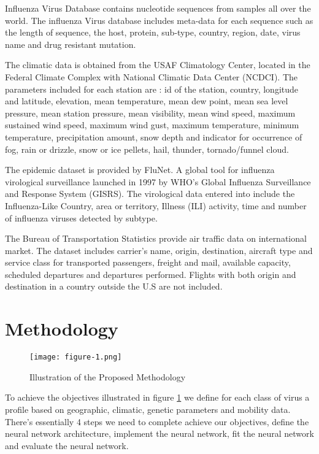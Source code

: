 \documentclass[12pt]{article}
\begin{document}
Influenza Virus Database\autocite{IVD-fb} contains nucleotide sequences from samples all over the world. The influenza Virus database includes meta-data for each sequence such as the length of sequence, the host, protein, sub-type, country, region, date, virus name and  drug resistant mutation. 

The climatic data is obtained from the USAF Climatology Center, located in the Federal Climate Complex with National Climatic Data Center (NCDCI)\autocite{Lott1998}. The parameters included for each station are : id of the station, country, longitude and latitude, elevation, mean temperature, mean dew point, mean sea level pressure, mean station pressure, mean visibility, mean wind speed, maximum sustained wind speed, maximum wind gust, maximum temperature, minimum temperature, precipitation amount, snow depth and indicator for occurrence of fog, rain or drizzle, snow or ice pellets, hail, thunder, tornado/funnel cloud.

The epidemic dataset is provided by FluNet\autocite{flahault1998}. A global tool for influenza virological surveillance launched in 1997  by WHO's Global Influenza Surveillance and Response System (GISRS). The virological data entered into include the Influenza-Like Country, area or territory, Illness (ILI) activity, time and number of influenza viruses detected by subtype.

The Bureau of Transportation Statistics provide air traffic data on international market. The dataset includes carrier's name, origin, destination, aircraft type and service class for transported passengers, freight and mail, available capacity, scheduled departures and departures performed. Flights with both origin and destination in a country outside the U.S are not included.

\section{Methodology}

\begin{figure}[h]
    \centering
    \texttt{[image: figure-1.png]}
    \caption{ Illustration of the Proposed Methodology}
    \label{fig:mesh1}
\end{figure}

To achieve the objectives illustrated in figure \ref{fig:mesh1} we define for each class of virus a profile based on geographic, climatic,  genetic parameters and mobility data. There's essentially 4 steps we need to complete achieve our objectives, define the neural network architecture, implement the neural network, fit the neural network and evaluate the neural network.
\end{document}
